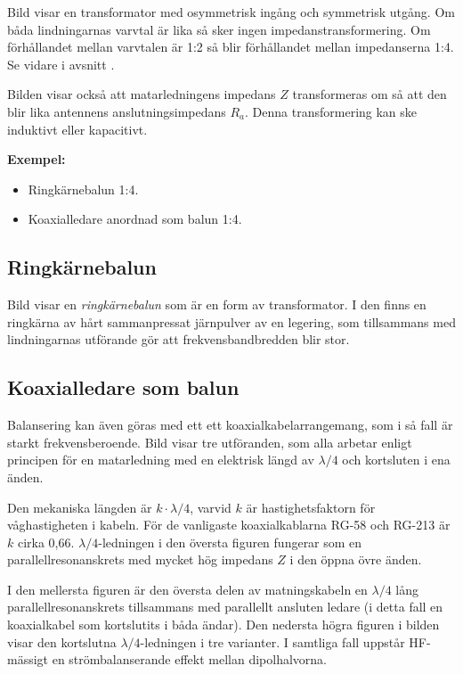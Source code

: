Bild  visar en transformator med osymmetrisk ingång och
symmetrisk utgång.
Om båda lindningarnas varvtal är lika så sker ingen impedanstransformering.
Om förhållandet mellan varvtalen är 1:2 så blir förhållandet mellan
impedanserna 1:4.
Se vidare i avsnitt .

Bilden visar också att matarledningens impedans \(Z\) transformeras om så
att den blir lika antennens anslutningsimpedans \(R_a\).
Denna transformering kan ske induktivt eller kapacitivt.

\noindent\textbf{Exempel:}
\begin{itemize}
\item Ringkärnebalun 1:4.
\item Koaxialledare anordnad som balun 1:4.
\end{itemize}

\subsection{Ringkärnebalun}

Bild  visar en \emph{ringkärnebalun} som är en form av
transformator.
I den finns en ringkärna av hårt sammanpressat järnpulver av en legering, som
tillsammans med lindningarnas utförande gör att frekvensbandbredden blir stor.


\subsection{Koaxialledare som balun}

Balansering kan även göras med ett ett koaxialkabelarrangemang, som i
så fall är starkt frekvensberoende.
Bild  visar tre utföranden, som alla arbetar enligt
principen för en matarledning med en elektrisk längd av \(\lambda/4\) och
kortsluten i ena änden.

Den mekaniska längden är \(k\cdot\lambda/4\), varvid \(k\) är hastighetsfaktorn
för våghastigheten i kabeln.
För de vanligaste koaxialkablarna RG-58 och RG-213 är \(k\) cirka 0,66.
\(\lambda/4\)-ledningen i den översta figuren fungerar som en
parallellresonanskrets med mycket hög impedans \(Z\) i den öppna övre änden.

I den mellersta figuren är den översta delen av matningskabeln en
\(\lambda/4\) lång parallellresonanskrets tillsammans med parallellt
ansluten ledare (i detta fall en koaxialkabel som kortslutits i båda ändar).
Den nedersta högra figuren i bilden visar den kortslutna
\(\lambda/4\)-ledningen i tre varianter.
I samtliga fall uppstår HF-mässigt en strömbalanserande effekt mellan
dipolhalvorna.

